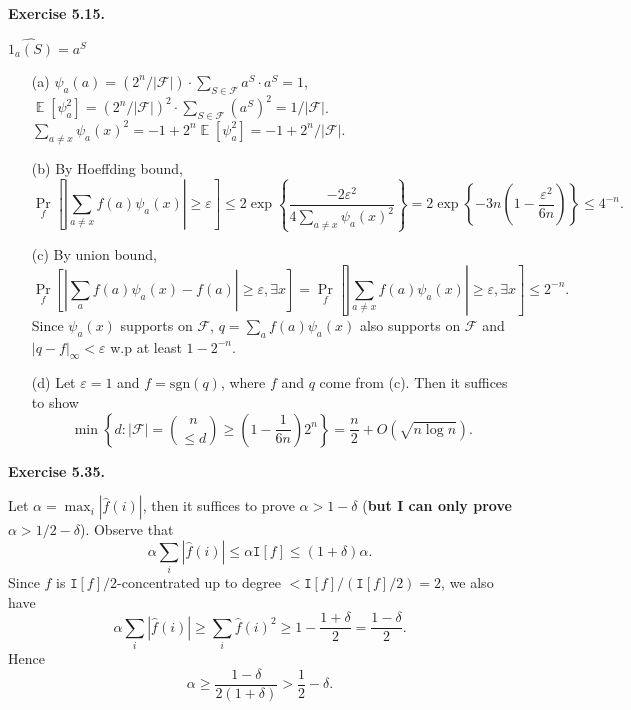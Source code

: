 \documentclass[a4paper]{article}
\newenvironment{exercise}[1]{
	\par
	\noindent\textbf{Exercise #1.}\quad
}{
	\par
	\bigskip
}
\DeclareMathOperator*{\E}{\mathbb E}
\newcommand{\eps}{\varepsilon}
\newcommand{\abs}[1]{{\left| #1 \right|}}
\newcommand{\pbra}[1]{{\left( #1 \right)}}
\newcommand{\cbra}[1]{{\left\{ #1 \right\}}}
\newcommand{\sbra}[1]{{\left[ #1 \right]}}
\newcommand{\sgn}{\text{sgn}}
\newcommand{\Fcal}{\mathcal{F}}
\newcommand{\Itt}{\mathtt{I}}
\begin{document}
\begin{exercise}{5.15}
    $\widehat{1_a(S)}=a^S$
    \begin{itemize}
        \item[(a)] $\psi_a(a)=\pbra{2^n/|\Fcal|}\cdot\sum_{S\in\Fcal}a^S\cdot a^S=1$, 
            $\E[\psi_a^2]=\pbra{2^n/|\Fcal|}^2\cdot\sum_{S\in\Fcal}\pbra{a^S}^2=1/|\Fcal|$.
            $\sum_{a\neq x}\psi_a(x)^2=-1+2^n\E\sbra{\psi_a^2}=-1+2^n/|\Fcal|$.
        \item[(b)] By Hoeffding bound,
            $$
            \Pr_f\sbra{\abs{\sum_{a\neq x}f(a)\psi_a(x)}\geq\eps}
            \leq2\exp\cbra{\frac{-2\eps^2}{4\sum_{a\neq x}\psi_a(x)^2}}
            =2\exp\cbra{-3n\pbra{1-\frac{\eps^2}{6n}}}
            \leq4^{-n}.
            $$
        \item[(c)] By union bound,
            $$
            \Pr_f\sbra{\abs{\sum_af(a)\psi_a(x)-f(a)}\geq\eps,\exists x}
            =\Pr_f\sbra{\abs{\sum_{a\neq x}f(a)\psi_a(x)}\geq\eps,\exists x}
            \leq2^{-n}.
            $$
            Since $\psi_a(x)$ supports on $\Fcal$, $q=\sum_af(a)\psi_a(x)$ also supports on $\Fcal$ and $\abs{q-f}_\infty<\eps$
            w.p at least $1-2^{-n}$.
        \item[(d)] Let $\eps=1$ and $f=\sgn(q)$, where $f$ and $q$ come from (c). Then it suffices to show
            $$
            \min\cbra{d:|\Fcal|=\binom n{\leq d}\geq\pbra{1-\frac1{6n}}2^n}=\frac n2+O(\sqrt{n\log n}).
            $$
    \end{itemize}
\end{exercise}

\begin{exercise}{5.35}
    Let $\alpha=\max_i\abs{\hat f(i)}$, then it suffices to prove $\alpha>1-\delta$ (\textbf{but I can only prove $\alpha>1/2-\delta$}).
    Observe that 
    $$
    \alpha\sum_i\abs{\hat f(i)}\leq\alpha\Itt[f]\leq(1+\delta)\alpha.
    $$
    Since $f$ is $\Itt[f]/2$-concentrated up to degree $<\Itt[f]/(\Itt[f]/2)=2$, we also have
    $$
    \alpha\sum_i\abs{\hat f(i)}\geq\sum_i\hat f(i)^2\geq1-\frac{1+\delta}2=\frac{1-\delta}2.
    $$
    Hence
    $$
    \alpha\geq\frac{1-\delta}{2(1+\delta)}>\frac12-\delta.
    $$
\end{exercise}
\end{document}
